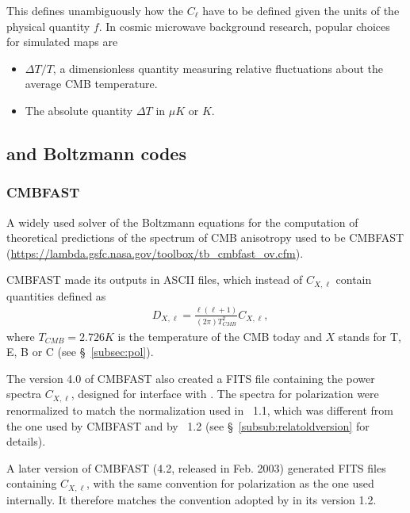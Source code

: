\documentclass[12pt,twoside]{article}
\newcommand{\myhtmlimage}[1]{ }
\begin{document}
This defines unambiguously how the $C_\ell$ have to be defined given the
units of the physical  quantity $f$. In  cosmic
microwave background research,
popular choices for simulated maps are 
\begin{itemize}
\item $\Delta T/T $, a dimensionless quantity measuring relative
fluctuations about the average CMB temperature.
\item The absolute quantity $\Delta T$ in $\mu K$ or $K$.
\end{itemize}

\subsection{\healpix and Boltzmann codes}
\subsubsection{CMBFAST}
\label{subsec:cmbfast}
A widely used  solver of the Boltzmann equations for the computation
of theoretical predictions of the spectrum of CMB anisotropy used to be CMBFAST
(\url{https://lambda.gsfc.nasa.gov/toolbox/tb_cmbfast_ov.cfm}).

CMBFAST made its outputs in ASCII files, which instead
of $C_{X,\ell}$ contain quantities defined as
\begin{align}
& D_{X,\ell} = \frac{\ell(\ell+1)}{(2\pi)T_{CMB}^2}C_{X,\ell},\myhtmlimage{}
\end{align}
where $T_{CMB}=2.726K$ is the temperature of the CMB today and $X$ stands for T,
E, B or C (see \S~\ref{subsec:pol}).  

The version 4.0 of CMBFAST also created a FITS file containing the power spectra
$C_{X,\ell}$, designed for interface with \healpixns. The spectra for polarization were renormalized to match the
normalization used in \healpixns~1.1, which was different from the one used by
CMBFAST and by \healpixns~1.2 (see \S~\ref{subsub:relatoldversion} for details).


A later version of CMBFAST (4.2, released in Feb. 2003) generated FITS files containing
$C_{X,\ell}$, with the same convention for polarization as the one used
internally. It therefore matches the convention adopted by \healpix in its
version 1.2.
\end{document}
